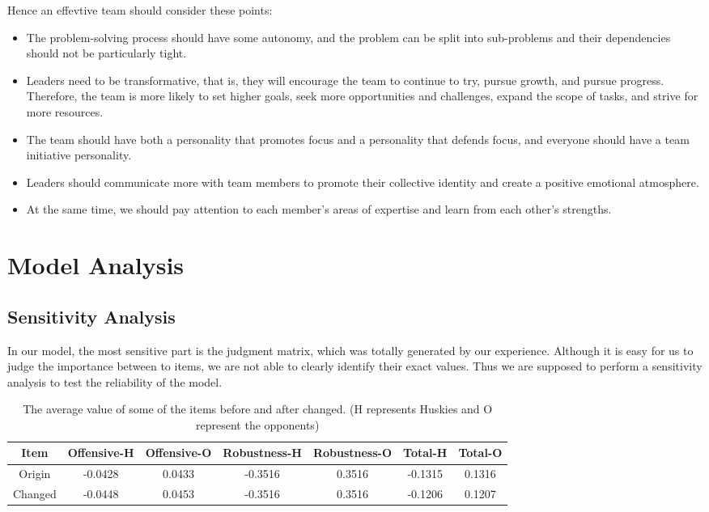 \documentclass{mcmthesis}
\begin{document}
	Hence an effevtive team should consider these points:
	\begin{itemize}
	\item The problem-solving process should have some autonomy, and the problem can be split into sub-problems and their dependencies should not be particularly tight.
	\item Leaders need to be transformative, that is, they will encourage the team to continue to try, pursue growth, and pursue progress.  Therefore, the team is more likely to set higher goals, seek more opportunities and challenges, expand the scope of tasks, and strive for more resources.
	\item The team should have both a personality that promotes focus and a personality that defends focus, and everyone should have a team initiative personality.
	\item Leaders should communicate more with team members to promote their collective identity and create a positive emotional atmosphere.
	\item At the same time, we should pay attention to each member's areas of expertise and learn from each other's strengths.
	\end{itemize}
	
\section{Model Analysis}
\subsection{Sensitivity Analysis}
In our model, the most sensitive part is the judgment matrix, which was totally generated by our experience. Although it is easy for us to judge the importance between to items, we are not able to clearly identify their exact values. Thus we are supposed to perform a sensitivity analysis to test the reliability of the model.\par

\begin{table}[htbp]
	\centering
	\label{table:sensitive}
	\caption{The average value of some of the items before and after changed. (H represents Huskies and O represent the opponents)}
	\begin{tabular}{ccccccc}
	\toprule
	Item & Offensive-H &Offensive-O&Robustness-H&Robustness-O&Total-H&Total-O\\
	\midrule
	Origin &-0.0428&0.0433&-0.3516&0.3516&-0.1315&0.1316\\ 
	Changed &-0.0448&0.0453&-0.3516&0.3516&-0.1206&0.1207\\ 
	\bottomrule
	\end{tabular}
\end{table}
\end{document}
